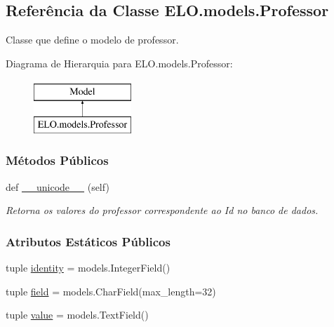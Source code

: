 \hypertarget{classELO_1_1models_1_1Professor}{}\subsection{Referência da Classe E\+L\+O.\+models.\+Professor}
\label{classELO_1_1models_1_1Professor}


Classe que define o modelo de professor.  


Diagrama de Hierarquia para E\+L\+O.\+models.\+Professor\+:\begin{figure}[H]
\begin{center}
\leavevmode
\includegraphics[height=2.000000cm]{d5/d93/classELO_1_1models_1_1Professor}
\end{center}
\end{figure}
\subsubsection*{Métodos Públicos}
\begin{DoxyCompactItemize}
\item 
def \hyperlink{classELO_1_1models_1_1Professor_a8c0714e4a283c139c0d7aed94a498a7b}{\+\_\+\+\_\+unicode\+\_\+\+\_\+} (self)
\begin{DoxyCompactList}\small\item\em Retorna os valores do professor correspondente ao Id no banco de dados. \end{DoxyCompactList}\end{DoxyCompactItemize}
\subsubsection*{Atributos Estáticos Públicos}
\begin{DoxyCompactItemize}
\item 
tuple \hyperlink{classELO_1_1models_1_1Professor_a314012619a14c0319c86ba52b6beeb2f}{identity} = models.\+Integer\+Field()
\item 
tuple \hyperlink{classELO_1_1models_1_1Professor_aaf0638dbb44d27f5acadeed376afafa1}{field} = models.\+Char\+Field(max\+\_\+length=32)
\item 
tuple \hyperlink{classELO_1_1models_1_1Professor_abfa283169333876d02cf63886ca872e6}{value} = models.\+Text\+Field()
\end{DoxyCompactItemize}


